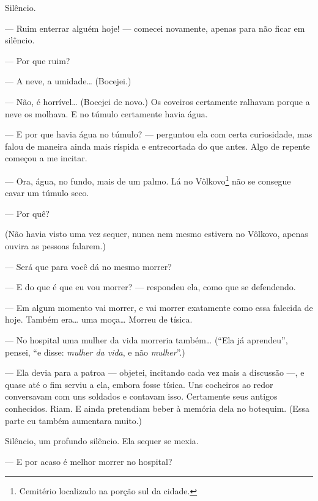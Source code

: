 Silêncio.

--- Ruim enterrar alguém hoje! --- comecei novamente, apenas para não ficar
em silêncio.

--- Por que ruim?

--- A neve, a umidade\ldots{} (Bocejei.)


--- Não, é horrível\ldots{} (Bocejei de novo.) Os coveiros certamente ralhavam
porque a neve os molhava. E no túmulo certamente havia água.

--- E por que havia água no túmulo? --- perguntou ela com certa curiosidade,
mas falou de maneira ainda mais ríspida e entrecortada do que antes.
Algo de repente começou a me incitar.

--- Ora, água, no fundo, mais de um palmo. Lá no Vôlkovo\footnote{
Cemitério localizado na porção sul da cidade.} não se consegue cavar um
túmulo seco.

--- Por quê?


(Não havia visto uma vez sequer, nunca nem mesmo estivera no Vôlkovo,
apenas ouvira as pessoas falarem.)

--- Será que para você dá no mesmo morrer?

--- E do que é que eu vou morrer? --- respondeu ela, como que se defendendo.

--- Em algum momento vai morrer, e vai morrer exatamente como essa
falecida de hoje. Também era\ldots{} uma moça\ldots{} Morreu de tísica.

--- No hospital uma mulher da vida morreria também\ldots{} (``Ela já aprendeu'',
pensei, ``e disse: \textit{mulher da vida}, e não \textit{mulher}''.)

--- Ela devia para a patroa --- objetei, incitando cada vez mais a discussão
---, e quase até o fim serviu a ela, embora fosse tísica. Uns cocheiros
ao redor conversavam com uns soldados e contavam isso. Certamente seus
antigos conhecidos. Riam. E ainda pretendiam beber à memória dela no
botequim. (Essa parte eu também aumentara muito.)

Silêncio, um profundo silêncio. Ela sequer se mexia.

--- E por acaso é melhor morrer no hospital?

